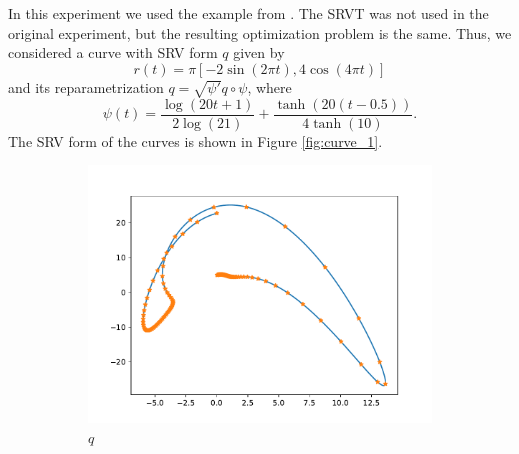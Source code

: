 In this experiment we used the example from \cite[Section 4.2.6]{jørgen2021}. The SRVT was not used in the original experiment, but the resulting optimization problem is the same. Thus, we considered a curve with SRV form \(q\) given by 
\begin{equation*}
    r(t) = \pi [-2 \sin(2\pi t), 4\cos(4\pi t)]
\end{equation*}
and its reparametrization \(q = \sqrt{\psi'}q \circ \psi\), where 
\begin{equation*}
    \psi(t) = \frac{\log(20t + 1)}{2 \log(21)} + \frac{\tanh(20(t - 0.5))}{4 \tanh(10)}.
\end{equation*}
The SRV form of the curves is shown in Figure \ref{fig:curve_1}. 

\begin{figure}[b]
    \begin{subfigure}[b]{0.5\textwidth}
        \centering
        \includegraphics[width=\linewidth]{figures/curve_1/curve_q.pdf}
        \caption{\(q\)}\label{fig:curve_1_q}
    \end{subfigure}
    \begin{subfigure}[t]{0.5\textwidth}

\end{subfigure}
\end{figure}
